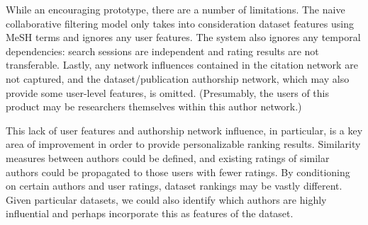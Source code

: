While an encouraging prototype, there are a number of limitations. The naive collaborative filtering model only takes into consideration dataset features using MeSH terms and ignores any user features. The system also ignores any temporal dependencies: search sessions are independent and rating results are not transferable. Lastly, any network influences contained in the citation network are not captured, and the dataset/publication authorship network, which may also provide some user-level features, is omitted. (Presumably, the users of this product may be researchers themselves within this author network.)

This lack of user features and authorship network influence, in particular, is a key area of improvement in order to provide personalizable ranking results. Similarity measures between authors could be defined, and existing ratings of similar authors could be propagated to those users with fewer ratings. By conditioning on certain authors and user ratings, dataset rankings may be vastly different. Given particular datasets, we could also identify which authors are highly influential and perhaps incorporate this as features of the dataset.